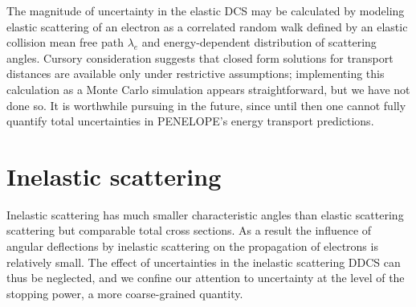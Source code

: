 \documentclass [11pt, proquest, article] {uwthesis}[2016/11/22]
\begin{document}
The magnitude of uncertainty in the elastic DCS may be calculated by modeling elastic scattering of an electron as a correlated random walk defined by an elastic collision mean free path $\lambda_e$ and energy-dependent distribution of scattering angles. Cursory consideration suggests that closed form solutions for transport distances are available only under restrictive assumptions; implementing this calculation as a Monte Carlo simulation appears straightforward, but we have not done so. It is worthwhile pursuing in the future, since until then one cannot fully quantify total uncertainties in PENELOPE's energy transport predictions. 

%


\section{Inelastic scattering}
Inelastic scattering has much smaller characteristic angles than elastic scattering scattering but comparable total cross sections. As a result the influence of angular deflections by inelastic scattering on the propagation of electrons is relatively small. The effect of uncertainties in the inelastic scattering DDCS can thus be neglected, and we confine our attention to uncertainty at the level of the stopping power, a more coarse-grained quantity.
\end{document}
